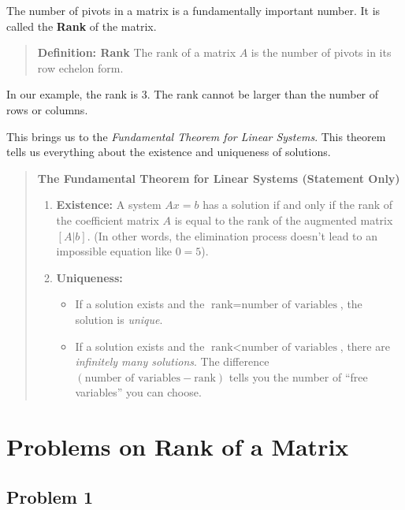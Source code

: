 \documentclass[
  letterpaper,
  DIV=11,
  numbers=noendperiod]{scrreprt}
\providecommand{\tightlist}{%
  \setlength{\itemsep}{0pt}\setlength{\parskip}{0pt}}
\begin{document}
The number of pivots in a matrix is a fundamentally important number. It
is called the \textbf{Rank} of the matrix.

\begin{quote}
\textbf{Definition: Rank} The rank of a matrix \(A\) is the number of
pivots in its row echelon form.
\end{quote}

In our example, the rank is 3. The rank cannot be larger than the number
of rows or columns.

This brings us to the \emph{Fundamental Theorem for Linear Systems}.
This theorem tells us everything about the existence and uniqueness of
solutions.

\begin{quote}
\textbf{The Fundamental Theorem for Linear Systems (Statement Only)}

\begin{enumerate}
\def\labelenumi{\arabic{enumi}.}
\item
  \textbf{Existence:} A system \(Ax = b\) has a solution if and only if
  the rank of the coefficient matrix \(A\) is equal to the rank of the
  augmented matrix \([A | b]\). (In other words, the elimination process
  doesn't lead to an impossible equation like \(0 = 5\)).
\item
  \textbf{Uniqueness:}

  \begin{itemize}
  \tightlist
  \item
    If a solution exists and the
    \(\text{rank} = \text{number of variables}\), the solution is
    \emph{unique}.
  \item
    If a solution exists and the
    \(\text{rank} < \text{number of variables}\), there are
    \emph{infinitely many solutions}. The difference
    \((\text{number of variables} - \text{rank})\) tells you the number
    of ``free variables'' you can choose.
  \end{itemize}
\end{enumerate}
\end{quote}

\section{Problems on Rank of a
Matrix}\label{problems-on-rank-of-a-matrix}

\subsection{Problem 1}\label{problem-1}
\end{document}
